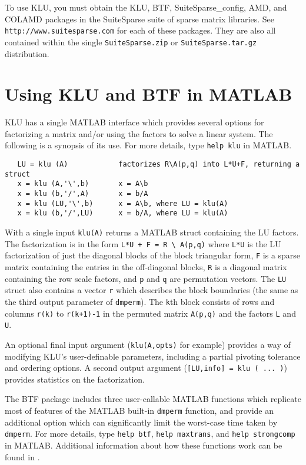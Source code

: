 \documentclass[11pt]{article}
\begin{document}
To use KLU, you must obtain the KLU, BTF, SuiteSparse\_config,
AMD, and COLAMD packages
in the SuiteSparse suite of sparse matrix libraries.  See 
{\tt http://www.suitesparse.com} for each of these packages.
They are also all contained within the single {\tt SuiteSparse.zip} or
{\tt SuiteSparse.tar.gz} distribution.

\section{Using KLU and BTF in MATLAB}

KLU has a single MATLAB interface which provides several options for factorizing
a matrix and/or using the factors to solve a linear system.  The following is
a synopsis of its use.  For more details, type {\tt help klu} in MATLAB.

{\footnotesize
\begin{verbatim}
   LU = klu (A)            factorizes R\A(p,q) into L*U+F, returning a struct
   x = klu (A,'\',b)       x = A\b
   x = klu (b,'/',A)       x = b/A
   x = klu (LU,'\',b)      x = A\b, where LU = klu(A)
   x = klu (b,'/',LU)      x = b/A, where LU = klu(A)
\end{verbatim}
}

With a single input {\tt klu(A)} returns a MATLAB struct containing the LU
factors.  The factorization is in the form \verb'L*U + F = R \ A(p,q)'
where {\tt L*U} is the LU factorization of just the diagonal blocks of the
block triangular form, {\tt F} is a sparse matrix containing the entries in
the off-diagonal blocks, {\tt R} is a diagonal matrix containing the row
scale factors, and {\tt p} and {\tt q} are permutation vectors.  The {\tt LU}
struct also contains a vector {\tt r} which describes the block boundaries
(the same as the third output parameter of {\tt dmperm}).  The {\tt k}th
block consists of rows and columns {\tt r(k)} to {\tt r(k+1)-1} in the
permuted matrix {\tt A(p,q)} and the factors {\tt L} and {\tt U}.

An optional final input argument ({\tt klu(A,opts)} for example) provides a
way of modifying KLU's user-definable parameters, including a partial pivoting
tolerance and ordering options.  A second output argument
({\tt [LU,info] = klu ( ... )}) provides statistics on the factorization.

The BTF package includes three user-callable MATLAB functions which replicate
most of features of the MATLAB built-in {\tt dmperm} function, and provide an
additional option which can significantly limit the worst-case time taken by
{\tt dmperm}.  For more details, type {\tt help btf}, {\tt help maxtrans},
and {\tt help strongcomp} in MATLAB.  Additional information about how
these functions work can be found in \cite{Davis06book}.
\end{document}

